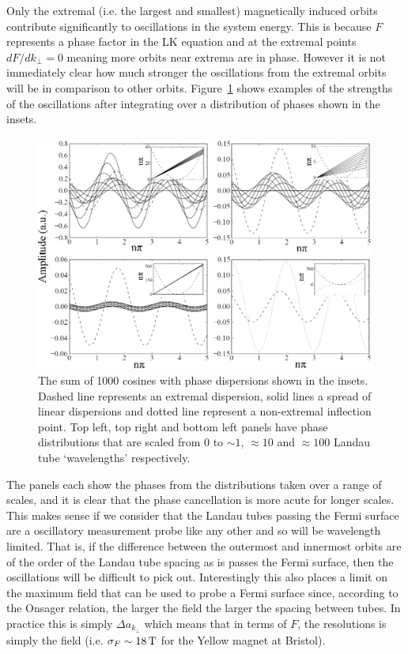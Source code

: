 Only the extremal (i.e. the largest and smallest) magnetically induced orbits contribute significantly to oscillations in the system energy. This is because $F$ represents a phase factor in the \ac{LK} equation and at the extremal points $dF/dk_\perp=0$ meaning more orbits near extrema are in phase. However it is not immediately clear how much stronger the oscillations from the extremal orbits will be in comparison to other orbits. Figure~\ref{Fig:Theo:ExtremalPhases} shows examples of the strengths of the oscillations after integrating over a distribution of phases shown in the insets.
\begin{figure}[htbp]
    \begin{center}
        \includegraphics[scale=0.8]{Chapter-ExperimentalTechnique/Figures/ExtremalPhases/ExtremalPhases}
        \caption{The sum of 1000 cosines with phase dispersions shown in the insets. Dashed line represents an extremal dispersion, solid lines a spread of linear dispersions and dotted line represent a non-extremal inflection point. Top left, top right and bottom left panels have phase distributions that are scaled from $0$ to $\sim1$, $\approx10$ and $\approx100$ Landau tube `wavelengths' respectively.}
        \label{Fig:Theo:ExtremalPhases}
    \end{center}
\end{figure}
The panels each show the phases from the distributions taken over a range of scales, and it is clear that the phase cancellation is more acute for longer scales. This makes sense if we consider that the Landau tubes passing the Fermi surface are a oscillatory measurement probe like any other and so will be wavelength limited. That is, if the difference between the outermost and innermost orbits are of the order of the Landau tube spacing as is passes the Fermi surface, then the oscillations will be difficult to pick out. Interestingly this also places a limit on the maximum field that can be used to probe a Fermi surface since, according to the Onsager relation, the larger the field the larger the spacing between tubes. In practice this is simply $\Delta a_{k_\perp}$ which means that in terms of $F$, the resolutions is simply the field (i.e. $\sigma_F \sim \unit[18]{T}$ for the Yellow magnet at Bristol). 

